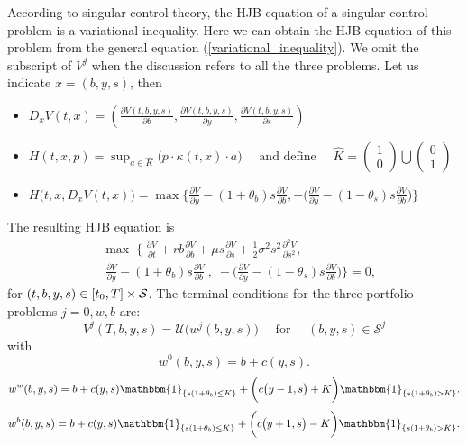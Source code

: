 According to singular control theory, the HJB equation of a singular control problem is a variational inequality. Here we can obtain the HJB equation of this problem 
from the general equation (\ref{variational_inequality}). We omit the subscript of $V^j$ when the discussion refers to all the three problems. 
Let us indicate $x = (b,y,s)$, then
\begin{itemize}
 \item $ D_x V(t,x) = \left( \frac{\partial V(t,b,y,s)}{\partial b}, \frac{\partial V(t,b,y,s)}{\partial y}, \frac{\partial V(t,b,y,s)}{\partial s} \right) $
 \item $H(t,x,p) = \sup_{a \in \hat K} \bigl( p \cdot \kappa(t,x) \cdot a  \bigr) \quad \mbox{ and define } 
        \quad \hat K = \left( \begin{array}{c}
			   1 \\
			   0
                          \end{array} \right) \bigcup \left( \begin{array}{c}
			   0 \\
			   1
                          \end{array}
  \right)$ 
 \item $H \bigl(t,x, D_x V(t,x) \bigr) = \max \biggl\{ \frac{\partial V}{\partial y}-(1+\theta_b) s \frac{\partial V}{\partial b} ,
 -\bigl( \frac{\partial V}{\partial y} -(1-\theta_s)s \frac{\partial V}{\partial b} \bigr) \biggr\} $
\end{itemize}
The resulting HJB equation is
\begin{align}\label{DPZ_HJB}
& \max \; \biggl\{ \; \frac{\partial V}{\partial t} + rb\frac{\partial V}{\partial b} 
+ \mu s \frac{\partial V}{\partial s} + \frac{1}{2}\sigma^2 s^2 \frac{\partial^2 V}{\partial s^2}, \\ \nonumber
& \;  \frac{\partial V}{\partial y}-(1+\theta_b) s \frac{\partial V}{\partial b} \; 
, \; -\biggl(\frac{\partial V}{\partial y}-(1-\theta_s)s \frac{\partial V}{\partial b} \biggr) \biggr\} = 0, 
\end{align}
for $(t,b,y,s) \in [t_0,T] \times \mathcal{S}$.
The terminal conditions for the three portfolio problems $j=0,w,b$ are:
\begin{equation}\label{terminal_conditions}
V^j(T,b,y,s) = \mathcal{U}\bigl( w^j(b,y,s) \bigr) \hspace{1em} \mbox{ for } \hspace{1em} (b,y,s) \in \mathcal{S}^j 
\end{equation}
with
  \begin{equation*}
   w^0(b,y,s) =  b + c(y,s).
  \end{equation*}
  \begin{equation*}
   w^w(b,y,s) =  b + c(y,s) \mathbbm{1}_{\{ s(1+\theta_b) \leq K\}} +
  \biggl( c\bigl( y-1,s \bigr) + K \biggr) \mathbbm{1}_{\{s(1+\theta_b)>K\}}.
  \end{equation*}
  \begin{equation*}
   w^b(b,y,s) = b + c(y,s) \mathbbm{1}_{\{ s(1+\theta_b) \leq K\}} +
  \biggl( c\bigl( y+1,s \bigr) - K \biggr) \mathbbm{1}_{\{s(1+\theta_b)>K\}}.
  \end{equation*}

